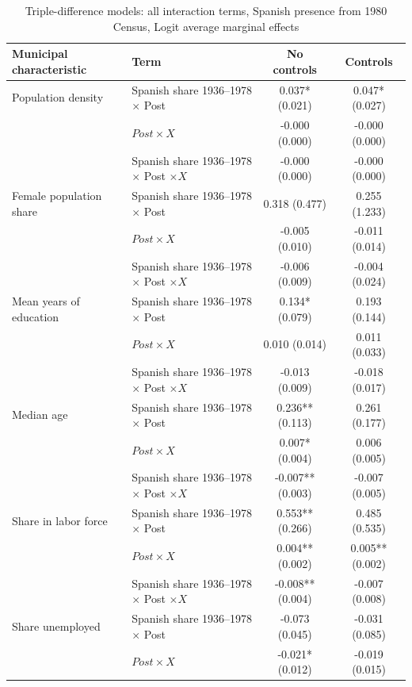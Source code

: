 \begin{table}[!htbp]
\small
\renewcommand{\arraystretch}{1}
\setlength{\tabcolsep}{3pt}
\centering
\caption{Triple-difference models: all interaction terms, Spanish presence from 1980 Census, Logit average marginal effects}
\label{tab:triple_pooled_all_c80_ame_stata}
\captionsetup{justification=centering}
\begin{tabular}{llcc}
\hline
Municipal characteristic & Term & No controls & Controls \\
\hline
Population density & Spanish share 1936--1978 \(\times\) Post & 0.037* (0.021) & 0.047* (0.027) \\
 & \(Post \times X\) & -0.000 (0.000) & -0.000 (0.000) \\
 & Spanish share 1936--1978 \(\times\) Post \(\times X\) & -0.000 (0.000) & -0.000 (0.000) \\
\addlinespace
Female population share & Spanish share 1936--1978 \(\times\) Post & 0.318 (0.477) & 0.255 (1.233) \\
 & \(Post \times X\) & -0.005 (0.010) & -0.011 (0.014) \\
 & Spanish share 1936--1978 \(\times\) Post \(\times X\) & -0.006 (0.009) & -0.004 (0.024) \\
\addlinespace
Mean years of education & Spanish share 1936--1978 \(\times\) Post & 0.134* (0.079) & 0.193 (0.144) \\
 & \(Post \times X\) & 0.010 (0.014) & 0.011 (0.033) \\
 & Spanish share 1936--1978 \(\times\) Post \(\times X\) & -0.013 (0.009) & -0.018 (0.017) \\
\addlinespace
Median age & Spanish share 1936--1978 \(\times\) Post & 0.236** (0.113) & 0.261 (0.177) \\
 & \(Post \times X\) & 0.007* (0.004) & 0.006 (0.005) \\
 & Spanish share 1936--1978 \(\times\) Post \(\times X\) & -0.007** (0.003) & -0.007 (0.005) \\
\addlinespace
Share in labor force & Spanish share 1936--1978 \(\times\) Post & 0.553** (0.266) & 0.485 (0.535) \\
 & \(Post \times X\) & 0.004** (0.002) & 0.005** (0.002) \\
 & Spanish share 1936--1978 \(\times\) Post \(\times X\) & -0.008** (0.004) & -0.007 (0.008) \\
\addlinespace
Share unemployed & Spanish share 1936--1978 \(\times\) Post & -0.073 (0.045) & -0.031 (0.085) \\
 & \(Post \times X\) & -0.021* (0.012) & -0.019 (0.015) \\

\end{tabular}
\end{table}
